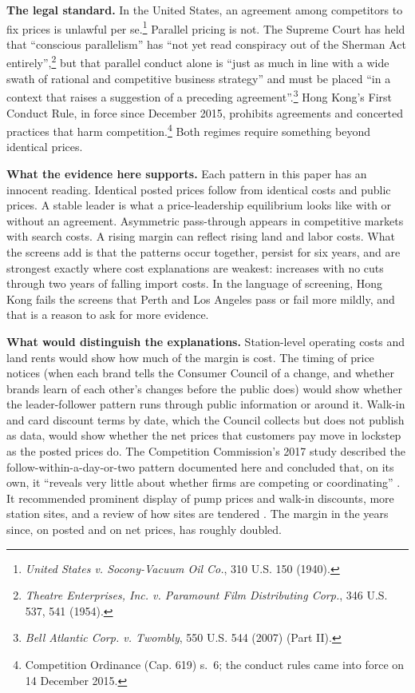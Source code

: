 \documentclass[11pt]{article}
\begin{document}
\textbf{The legal standard.} In the United States, an agreement among competitors to fix prices is unlawful per se.\footnote{\emph{United States v. Socony-Vacuum Oil Co.}, 310 U.S. 150 (1940).} Parallel pricing is not. The Supreme Court has held that ``conscious parallelism'' has ``not yet read conspiracy out of the Sherman Act entirely'',\footnote{\emph{Theatre Enterprises, Inc. v. Paramount Film Distributing Corp.}, 346 U.S. 537, 541 (1954).} but that parallel conduct alone is ``just as much in line with a wide swath of rational and competitive business strategy'' and must be placed ``in a context that raises a suggestion of a preceding agreement''.\footnote{\emph{Bell Atlantic Corp. v. Twombly}, 550 U.S. 544 (2007) (Part II).} Hong Kong's First Conduct Rule, in force since December 2015, prohibits agreements and concerted practices that harm competition.\footnote{Competition Ordinance (Cap. 619) s.~6; the conduct rules came into force on 14 December 2015.} Both regimes require something beyond identical prices.

\textbf{What the evidence here supports.} Each pattern in this paper has an innocent reading. Identical posted prices follow from identical costs and public prices. A stable leader is what a price-leadership equilibrium looks like with or without an agreement. Asymmetric pass-through appears in competitive markets with search costs. A rising margin can reflect rising land and labor costs. What the screens add is that the patterns occur together, persist for six years, and are strongest exactly where cost explanations are weakest: increases with no cuts through two years of falling import costs. In the language of screening, Hong Kong fails the screens that Perth and Los Angeles pass or fail more mildly, and that is a reason to ask for more evidence.

\textbf{What would distinguish the explanations.} Station-level operating costs and land rents would show how much of the margin is cost. The timing of price notices (when each brand tells the Consumer Council of a change, and whether brands learn of each other's changes before the public does) would show whether the leader-follower pattern runs through public information or around it. Walk-in and card discount terms by date, which the Council collects but does not publish as data, would show whether the net prices that customers pay move in lockstep as the posted prices do. The Competition Commission's 2017 study described the follow-within-a-day-or-two pattern documented here and concluded that, on its own, it ``reveals very little about whether firms are competing or coordinating'' \parencite{compcommglance}. It recommended prominent display of pump prices and walk-in discounts, more station sites, and a review of how sites are tendered \parencite{compcomm2017}. The margin in the years since, on posted and on net prices, has roughly doubled.
\end{document}
